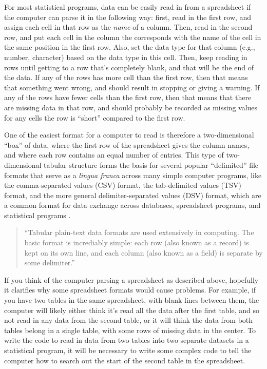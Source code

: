 \documentclass[]{tufte-book}
\begin{document}
For most statistical programs, data can be easily read in from a spreadsheet if
the computer can parse it in the following way: first, read in the first row,
and assign each cell in that row as the \emph{name} of a column. Then, read in the
second row, and put each cell in the column the corresponds with the name of the
cell in the same position in the first row. Also, set the data type for that
column (e.g., number, character) based on the data type in this cell. Then, keep
reading in rows until getting to a row that's completely blank, and that will be
the end of the data. If any of the rows has more cell than the first row, then
that means that something went wrong, and should result in stopping or giving a
warning. If any of the rows have fewer cells than the first row, then that means
that there are missing data in that row, and should probably be recorded as
missing values for any cells the row is ``short'' compared to the first row.

One of the easiest format for a computer to read is therefore a two-dimensional
``box'' of data, where the first row of the spreadsheet gives the column names,
and where each row contains an equal number of entries. This type of
two-dimensional tabular structure forms the basis for several popular
``delimited'' file formats that serve as a \emph{lingua franca} across many simple
computer programs, like the comma-separated values (CSV) format, the
tab-delimited values (TSV) format, and the more general delimiter-separated
values (DSV) format, which are a common format for data exchange across
databases, spreadsheet programs, and statistical programs \citep{janssens2014data, raymond2003art, buffalo2015bioinformatics}.

\begin{quote}
``Tabular plain-text data formats are used extensively in computing. The basic
format is incrediably simple: each row (also known as a record) is kept on its
own line, and each column (also known as a field) is separate by some delimiter.''
\citep{buffalo2015bioinformatics}
\end{quote}

If you think of the computer parsing a spreadsheet as described above, hopefully
it clarifies why some spreadsheet formats would cause problems. For example, if
you have two tables in the same spreadsheet, with blank lines between them, the
computer will likely either think it's read all the data after the first table,
and so not read in any data from the second table, or it will think the data
from both tables belong in a single table, with some rows of missing data in the
center. To write the code to read in data from two tables into two separate
datasets in a statistical program, it will be necessary to write some complex
code to tell the computer how to search out the start of the second table in the
spreadsheet.
\end{document}
